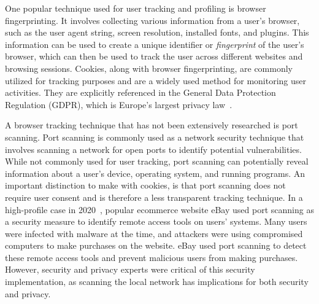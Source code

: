 One popular technique used for user tracking and profiling is browser fingerprinting. It involves collecting various information from a user's browser, such as the user agent string, screen resolution, installed fonts, and plugins. This information can be used to create a unique identifier or \emph{fingerprint} of the user's browser, which can then be used to track the user across different websites and browsing sessions. Cookies, along with browser fingerprinting, are commonly utilized for tracking purposes and are a widely used method for monitoring user activities. They are explicitly referenced in the General Data Protection Regulation (GDPR), which is Europe's largest privacy law~.

A browser tracking technique that has not been extensively researched is port scanning. Port scanning is commonly used as a network security technique that involves scanning a network for open ports to identify potential vulnerabilities. While not commonly used for user tracking, port scanning can potentially reveal information about a user's device, operating system, and running programs. An important distinction to make with cookies, is that port scanning does not require user consent and is therefore a less transparent tracking technique.
In a high-profile case in 2020~, popular ecommerce website eBay used port scanning as a security measure to identify remote access tools on users' systems. Many users were infected with malware at the time, and attackers were using compromised computers to make purchases on the website. eBay used port scanning to detect these remote access tools and prevent malicious users from making purchases. However, security and privacy experts were critical of this security implementation, as scanning the local network has implications for both security and privacy.

